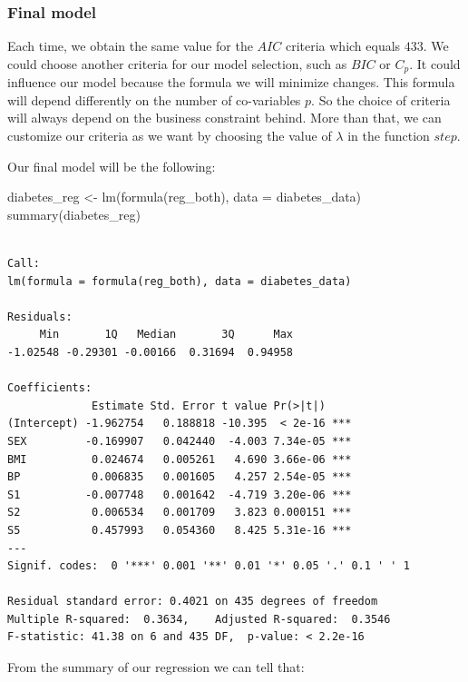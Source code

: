 \documentclass[
]{article}
\newenvironment{Shaded}{\begin{snugshade}}{\end{snugshade}}
\newcommand{\AttributeTok}[1]{\textcolor[rgb]{0.77,0.63,0.00}{#1}}
\newcommand{\FunctionTok}[1]{\textcolor[rgb]{0.00,0.00,0.00}{#1}}
\newcommand{\NormalTok}[1]{#1}
\newcommand{\OtherTok}[1]{\textcolor[rgb]{0.56,0.35,0.01}{#1}}
\begin{document}
\hypertarget{final-model}{%
\subsubsection{Final model}\label{final-model}}

Each time, we obtain the same value for the \(AIC\) criteria which
equals \(433\). We could choose another criteria for our model
selection, such as \(BIC\) or \(C_p\). It could influence our model
because the formula we will minimize changes. This formula will depend
differently on the number of co-variables \(p\). So the choice of
criteria will always depend on the business constraint behind. More than
that, we can customize our criteria as we want by choosing the value of
\(\lambda\) in the function \(step\).

Our final model will be the following:

\begin{Shaded}
\begin{Highlighting}[]
\NormalTok{diabetes\_reg }\OtherTok{\textless{}{-}} \FunctionTok{lm}\NormalTok{(}\FunctionTok{formula}\NormalTok{(reg\_both), }\AttributeTok{data =}\NormalTok{ diabetes\_data)}
\FunctionTok{summary}\NormalTok{(diabetes\_reg)}
\end{Highlighting}
\end{Shaded}

\begin{verbatim}

Call:
lm(formula = formula(reg_both), data = diabetes_data)

Residuals:
     Min       1Q   Median       3Q      Max 
-1.02548 -0.29301 -0.00166  0.31694  0.94958 

Coefficients:
             Estimate Std. Error t value Pr(>|t|)    
(Intercept) -1.962754   0.188818 -10.395  < 2e-16 ***
SEX         -0.169907   0.042440  -4.003 7.34e-05 ***
BMI          0.024674   0.005261   4.690 3.66e-06 ***
BP           0.006835   0.001605   4.257 2.54e-05 ***
S1          -0.007748   0.001642  -4.719 3.20e-06 ***
S2           0.006534   0.001709   3.823 0.000151 ***
S5           0.457993   0.054360   8.425 5.31e-16 ***
---
Signif. codes:  0 '***' 0.001 '**' 0.01 '*' 0.05 '.' 0.1 ' ' 1

Residual standard error: 0.4021 on 435 degrees of freedom
Multiple R-squared:  0.3634,    Adjusted R-squared:  0.3546 
F-statistic: 41.38 on 6 and 435 DF,  p-value: < 2.2e-16
\end{verbatim}

From the summary of our regression we can tell that:
\end{document}
